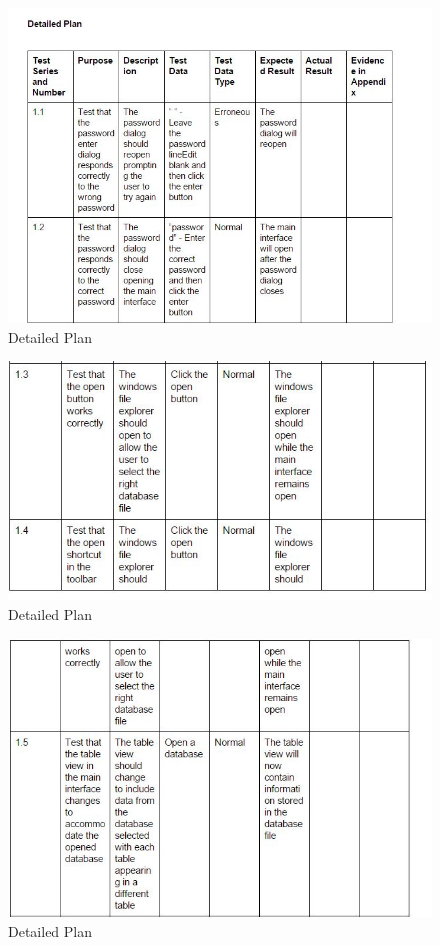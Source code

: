 \begin{itemize}
\begin{figure}[H]
    \includegraphics[width=\textwidth]{DP1.JPG}
    \caption{Detailed Plan} \label{fig:VDetailed Plan}
\end{figure}

\begin{figure}[H]
    \includegraphics[width=\textwidth]{DP2.JPG}
    \caption{Detailed Plan} \label{fig:VDetailed Plan}
\end{figure}

\begin{figure}[H]
    \includegraphics[width=\textwidth]{DP3.JPG}
    \caption{Detailed Plan} \label{fig:VDetailed Plan}
\end{figure}


\end{itemize}
